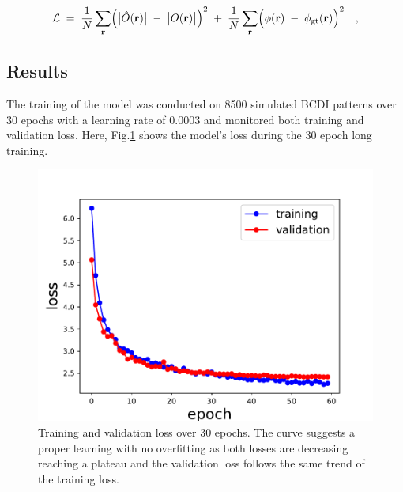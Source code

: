 \begin{equation}
    \mathcal{L}
    \;=\;
    \frac{1}{N}\sum_{\mathbf{r}}
    \Bigl(\bigl|\hat{O}(\mathbf{r})\bigr|
        \;-\;\bigl|O(\mathbf{r})\bigr|\Bigr)^{2}
    \;+\;
    \frac{1}{N}\sum_{\mathbf{r}}
    \Bigl(\phi(\mathbf{r})
        \;-\;\phi_{\mathrm{gt}}(\mathbf{r})\Bigr)^{2}
    \quad,
    \label{eq:loss}
\end{equation}

\subsection{Results}
The training of the model was conducted on 8500 simulated BCDI patterns over 30 epochs with a learning rate of 0.0003
and monitored both training and validation loss. Here, Fig.\ref{fig:loss_2mse_nosymm} shows the model's loss during the 
30 epoch long training. 

\begin{figure}[H]
    \centering
    \includegraphics[width=.8\textwidth]{figures/Phasing/loss_low_strain_noiseless_doubleMSE_nosymm.pdf}
    \caption{Training and validation loss over 30 epochs. The curve suggests a proper learning with no overfitting as 
    both losses are decreasing reaching a plateau and the validation loss follows the same trend of the training loss.}
    \label{fig:loss_2mse_nosymm}
\end{figure}

